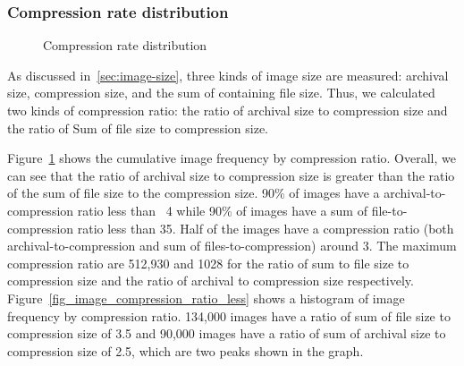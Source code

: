 \subsubsection{Compression rate distribution}

\begin{figure}[!t]
	\centering
	\caption{Compression rate distribution}
	\label{fig-image-compression-ratio}
\end{figure}

As discussed in~\ref{sec:image-size}, three kinds of image size are measured: archival size, compression size, and the sum of containing file size. Thus, we calculated two kinds of compression ratio: the ratio of archival size to compression size and the ratio of Sum of file size to compression size. 

Figure~\ref{fig-image-compression-ratio} shows the cumulative image frequency by compression ratio. Overall, we can see that the ratio of archival size to compression size is greater than the ratio of the sum of file size to the compression size. 90\% of images have a archival-to-compression ratio less than ~4 while 90\% of images have a sum of file-to-compression ratio less than 35. Half of the images have a compression ratio (both archival-to-compression and sum of files-to-compression) around 3. The maximum compression ratio are 512,930 and 1028 for the ratio of sum to file size to compression size and the ratio of archival to compression size respectively.
Figure~\ref{fig_image_compression_ratio_less} shows a histogram of image frequency by compression ratio. 134,000 images have a ratio of sum of file size to compression size of 3.5 and 90,000 images have a ratio of sum of archival size to compression size of 2.5, which are two peaks shown in the graph.

